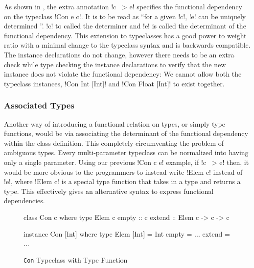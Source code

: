\documentclass[manuscript,screen,nonacm]{acmart}
\begin{document}
As shown in , the extra annotation !c ~> e! specifies the functional dependency on the typeclass !Con e c!. It is to be read as ``for a given !c!, !e! can be uniquely determined ''. !c! to called the determiner and !e! is called the determinant of the functional dependency. This extension to typeclasses has a good power to weight ratio with a minimal change to the typeclass syntax and is backwards compatible. The instance declarations do not change, however there needs to be an extra check while type checking the instance declarations to verify that the new instance does not violate the functional dependency: We cannot allow both the typeclass instances, !Con Int [Int]! and !Con Float [Int]! to exist together.
%

\subsubsection{Associated Types}
Another way of introducing a functional relation on types, or simply type functions, would be via associating the determinant of the functional dependency within the class definition\cite{chakravarty_associated_2005}. This completely circumventing the problem of ambiguous types. Every multi-parameter typeclass can be normalized into having only a single parameter. Using our previous !Con c e! example, if !c ~> e! then, it would be more obvious to the programmers to instead write !Elem c! instead of !e!, where !Elem c! is a special type function that takes in a type and returns a type. This effectively gives an alternative syntax to express functional dependencies.
\begin{figure}[ht]
\begin{center}
\begin{minipage}[ht]{0.4\linewidth}
\begin{code}
class Con c where
  type Elem c
  empty :: c
  extend :: Elem c -> c -> c
\end{code}
\end{minipage}%
\begin{minipage}[ht]{0.4\linewidth}
\begin{code}
instance Con [Int] where
  type Elem [Int] = Int
  empty = ...
  extend = ...
\end{code}
\end{minipage}
\end{center}
\caption[Con typeclass]{\lstinline{Con} Typeclass with Type Function}
\label{fig:assoc-types}
\end{figure}
\end{document}
